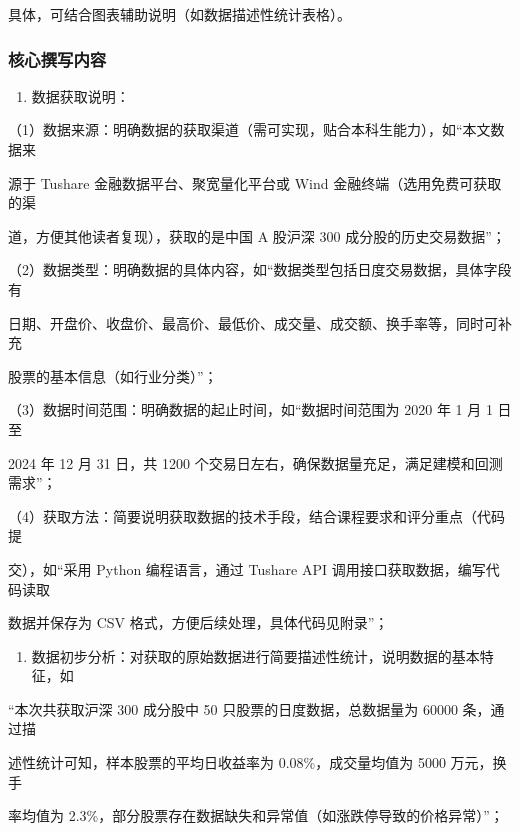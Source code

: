 \documentclass[
]{article}
\providecommand{\tightlist}{%
  \setlength{\itemsep}{0pt}\setlength{\parskip}{0pt}}
\begin{document}
具体，可结合图表辅助说明（如数据描述性统计表格）。

\hypertarget{ux6838ux5fc3ux64b0ux5199ux5185ux5bb9-1}{%
\subsubsection{\texorpdfstring{\textbf{核心撰写内容}}{核心撰写内容}}\label{ux6838ux5fc3ux64b0ux5199ux5185ux5bb9-1}}

\begin{enumerate}
\def\labelenumi{\arabic{enumi}.}
\tightlist
\item
  数据获取说明：
\end{enumerate}

（1）数据来源：明确数据的获取渠道（需可实现，贴合本科生能力），如``本文数据来

源于 Tushare 金融数据平台、聚宽量化平台或 Wind
金融终端（选用免费可获取的渠

道，方便其他读者复现），获取的是中国 A 股沪深 300
成分股的历史交易数据''；

（2）数据类型：明确数据的具体内容，如``数据类型包括日度交易数据，具体字段有

日期、开盘价、收盘价、最高价、最低价、成交量、成交额、换手率等，同时可补充

股票的基本信息（如行业分类）''；

（3）数据时间范围：明确数据的起止时间，如``数据时间范围为 2020 年 1 月 1
日至

2024 年 12 月 31 日，共 1200
个交易日左右，确保数据量充足，满足建模和回测需求''；

（4）获取方法：简要说明获取数据的技术手段，结合课程要求和评分重点（代码提

交），如``采用 Python 编程语言，通过 Tushare API
调用接口获取数据，编写代码读取

数据并保存为 CSV 格式，方便后续处理，具体代码见附录''；

\begin{enumerate}
\def\labelenumi{\arabic{enumi}.}
\setcounter{enumi}{1}
\tightlist
\item
  数据初步分析：对获取的原始数据进行简要描述性统计，说明数据的基本特征，如
\end{enumerate}

``本次共获取沪深 300 成分股中 50 只股票的日度数据，总数据量为 60000
条，通过描

述性统计可知，样本股票的平均日收益率为 0.08\%，成交量均值为 5000
万元，换手

率均值为
2.3\%，部分股票存在数据缺失和异常值（如涨跌停导致的价格异常）''；
\end{document}
